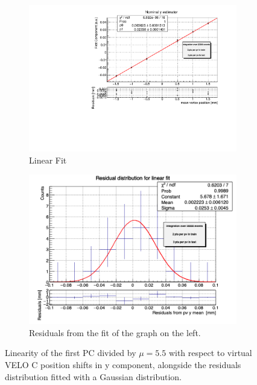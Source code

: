 \begin{figure}
    \centering
    \begin{subfigure}{0.48\textwidth}
    \includegraphics[width=\linewidth]{figures/y_fit_veloC_MC_normalised.pdf}
    \caption{Linear Fit}\label{fig:y_veloC_fit_MC}
    \end{subfigure}
    \begin{subfigure}{0.48\textwidth}
    \includegraphics[width=\linewidth]{figures/y_res_veloC_MC.png}
    \caption{Residuals from the fit of the graph on the left. }\label{fig:y_veloC_res_MC}
    \end{subfigure}
    \caption{Linearity of the first PC divided by $\mu=5.5$ with respect to  virtual VELO C position shifts in y component, alongside the residuals distribution fitted with a Gaussian distribution.}
    \label{fig:y_veloC_MC}
\end{figure}

